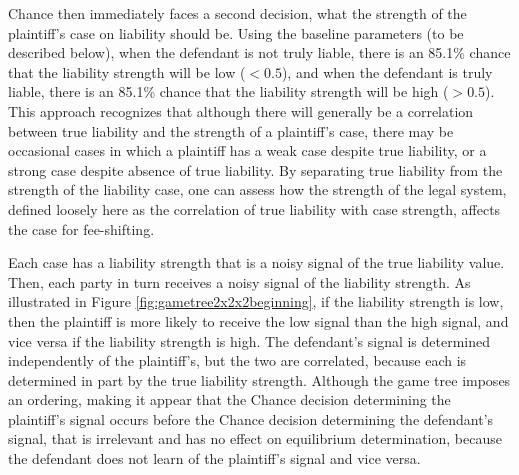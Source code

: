\documentclass{article}
\begin{document}
Chance then immediately faces a second decision, what the strength of the plaintiff's case on liability should be. Using the baseline parameters (to be described below), when the defendant is not truly liable, there is an 85.1\% chance that the liability strength will be low ($< 0.5$), and when the defendant is truly liable, there is an 85.1\% chance that the liability strength will be high ($> 0.5$). This approach recognizes that although there will generally be a correlation between true liability and the strength of a plaintiff's case, there may be occasional cases in which a plaintiff has a weak case despite true liability, or a strong case despite absence of true liability. By separating true liability from the strength of the liability case, one can assess how the strength of the legal system, defined loosely here as the correlation of true liability with case strength, affects the case for fee-shifting. 

Each case has a liability strength that is a noisy signal of the true liability value. Then, each party in turn receives a noisy signal of the liability strength.  As illustrated in Figure \ref{fig:gametree2x2x2beginning}, if the liability strength is low, then the plaintiff is more likely to receive the low signal than the high signal, and vice versa if the liability strength is high. The defendant's signal is determined independently of the plaintiff's, but the two are correlated, because each is determined in part by the true liability strength. Although the game tree imposes an ordering, making it appear that the Chance decision determining the plaintiff's signal occurs before the Chance decision determining the defendant's signal, that is irrelevant and has no effect on equilibrium determination, because the defendant does not learn of the plaintiff's signal and vice versa.
\end{document}
